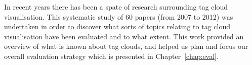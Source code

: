 In recent years there has been a spate of research surrounding tag cloud visualisation. This systematic study of 60 papers (from 2007 to 2012) was undertaken in order to discover what sorts of topics relating to tag cloud visualisation have been evaluated and to what extent. This work provided an overview of what is known about tag clouds, and helped us plan and focus our overall evaluation strategy which is presented in Chapter~\ref{chap:eval}.



